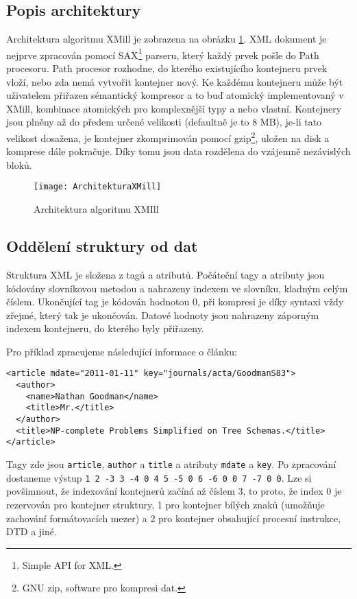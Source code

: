 \subsection{Popis architektury}
Architektura algoritmu XMill je zobrazena na obrázku \ref{architekturaXMill}. XML dokument je nejprve zpracován pomocí SAX\footnote{Simple API for XML.} parseru, který každý prvek pošle do Path procesoru. Path procesor rozhodne, do kterého existujícího kontejneru prvek vloží, nebo zda nemá vytvořit kontejner nový. Ke každému kontejneru může být uživatelem přiřazen sémantický kompresor a to buď atomický implementovaný v XMill, kombinace atomických pro komplexnější typy a nebo vlastní. Kontejnery jsou plněny až do předem určené velikosti (defaultně je to 8 MB), je-li tato velikost dosažena, je kontejner zkomprimován pomocí gzip\footnote{GNU zip, software pro kompresi dat.}, uložen na disk a komprese dále pokračuje. Díky tomu jsou data rozdělena do vzájemně nezávislých bloků.


\begin{figure}[!htb]
\centering
\texttt{[image: ArchitekturaXMill]}
\caption{Architektura algoritmu XMIll \cite{xmill}}
\label{architekturaXMill}
\end{figure}

\subsection{Oddělení struktury od dat}
\label{xmillOddeleniStruktury}
Struktura XML je složena z tagů a atributů. Počáteční tagy a atributy jsou kódovány slovníkovou metodou a nahrazeny indexem ve slovníku, kladným celým číslem. Ukončující tag je kódován hodnotou 0, při kompresi je díky syntaxi vždy zřejmé, který tak je ukončován. Datové hodnoty jsou nahrazeny záporným indexem kontejneru, do kterého byly přiřazeny.\cite{xmill}

Pro příklad zpracujeme následující informace o článku:

\begin{verbatim}
<article mdate="2011-01-11" key="journals/acta/GoodmanS83">
  <author>
    <name>Nathan Goodman</name>
    <title>Mr.</title>
  </author>
  <title>NP-complete Problems Simplified on Tree Schemas.</title>
</article>
\end{verbatim}

Tagy zde jsou \texttt{article}, \texttt{author} a \texttt{title} a atributy \texttt{mdate} a \texttt{key}. Po zpracování dostaneme výstup \texttt{1 2 -3 3 -4 0 4 5 -5 0 6 -6 0 0 7 -7 0 0}. Lze si povšimnout, že indexování kontejnerů začíná až číslem 3, to proto, že index 0 je rezervován pro kontejner struktury, 1 pro kontejner bílých znaků (umožňuje zachování formátovacích mezer) a 2 pro kontejner obsahující procesní instrukce, DTD a jiné.

